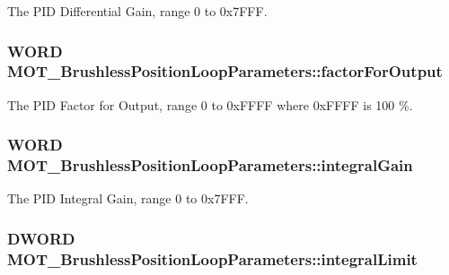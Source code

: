 The P\+ID Differential Gain, range 0 to 0x7\+F\+FF. 

\subsubsection[{\texorpdfstring{factor\+For\+Output}{factorForOutput}}]{\setlength{\rightskip}{0pt plus 5cm}W\+O\+RD M\+O\+T\+\_\+\+Brushless\+Position\+Loop\+Parameters\+::factor\+For\+Output}\hypertarget{struct_m_o_t___brushless_position_loop_parameters_a1cd79ba1eca19580b5231cdb3f627957}{}\label{struct_m_o_t___brushless_position_loop_parameters_a1cd79ba1eca19580b5231cdb3f627957}


The P\+ID Factor for Output, range 0 to 0x\+F\+F\+FF where 0x\+F\+F\+FF is 100 \%. 

\subsubsection[{\texorpdfstring{integral\+Gain}{integralGain}}]{\setlength{\rightskip}{0pt plus 5cm}W\+O\+RD M\+O\+T\+\_\+\+Brushless\+Position\+Loop\+Parameters\+::integral\+Gain}\hypertarget{struct_m_o_t___brushless_position_loop_parameters_a0273c9a1ce5719bd31f04a42c530a2d1}{}\label{struct_m_o_t___brushless_position_loop_parameters_a0273c9a1ce5719bd31f04a42c530a2d1}


The P\+ID Integral Gain, range 0 to 0x7\+F\+FF. 

\subsubsection[{\texorpdfstring{integral\+Limit}{integralLimit}}]{\setlength{\rightskip}{0pt plus 5cm}D\+W\+O\+RD M\+O\+T\+\_\+\+Brushless\+Position\+Loop\+Parameters\+::integral\+Limit}\hypertarget{struct_m_o_t___brushless_position_loop_parameters_a7b8b0a0fc58d60026af30627c3b80355}{}\label{struct_m_o_t___brushless_position_loop_parameters_a7b8b0a0fc58d60026af30627c3b80355}


